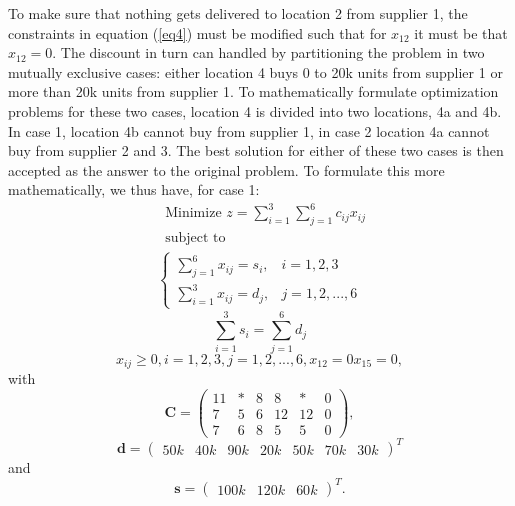\documentclass{article}
\begin{document}
  \noindent
  To make sure that nothing gets delivered to location 2 from supplier 1, the constraints in equation (\ref{eq4}) must be modified such that for $x_{12}$ it must be that $x_{12} = 0$. The discount in turn can handled by partitioning the problem in two mutually exclusive cases: either location 4 buys 0 to 20k units from supplier 1 or more than 20k units from supplier 1. To mathematically formulate optimization problems for these two cases, location 4 is divided into two locations, 4a and 4b. In case 1, location 4b cannot buy from supplier 1, in case 2 location 4a cannot buy from supplier 2 and 3. The best solution for either of these two cases is then accepted as the answer to the original problem. To formulate this more mathematically, we thus have, for case 1:
  \begin{align*}
  & \text{Minimize } z = \sum_{i=1}^{3}\sum_{j=1}^6 c_{ij}x_{ij} \\
  & \text{subject to}
    \label{eq10}
  \end{align*}
  \begin{align}
    \begin{cases}
      \sum_{j=1}^{6} x_{ij} = s_{i}, & i = 1, 2, 3 \\
      \sum_{i=1}^{3} x_{ij} = d_{j}, & j = 1, 2, ..., 6
    \end{cases}
  \end{align}
  \begin{equation}
    \sum_{i=1}^{3} s_{i} = \sum_{j=1}^6 d_{j}
    \label{eq12}
  \end{equation}
  \begin{equation}
    x_{ij} \geq 0, i = 1, 2, 3, j = 1, 2, ..., 6, x_{12} = 0 x_{15} = 0,
    \label{eq13}
  \end{equation}
  with
  \begin{equation}
    \mathbf{C} = 
    \begin{pmatrix}
      11 & * & 8 & 8  & *  & 0\\
      7  & 5 & 6 & 12 & 12 & 0\\
      7  & 6 & 8 & 5  & 5  & 0
    \end{pmatrix},
    \label{eq14}
  \end{equation}
  \begin{equation}
    \mathbf{d} =
    \begin{pmatrix}
      50k & 40k & 90k & 20k & 50k & 70k & 30k
    \end{pmatrix}^T
    \label{eq15}
  \end{equation}
  and
  \begin{equation}
    \mathbf{s} =
    \begin{pmatrix}
      100k & 120k & 60k
    \end{pmatrix}^T.
    \label{eq16}
  \end{equation}
\end{document}

